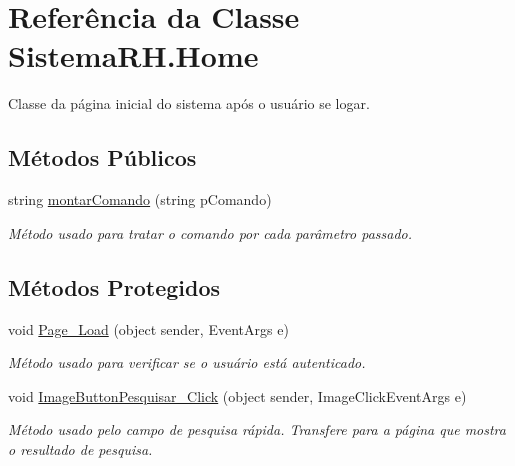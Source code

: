 \hypertarget{class_sistema_r_h_1_1_home}{
\section{Referência da Classe SistemaRH.Home}
\label{class_sistema_r_h_1_1_home}
}


Classe da página inicial do sistema após o usuário se logar.  


\subsection*{Métodos Públicos}
\begin{DoxyCompactItemize}
\item 
string \hyperlink{class_sistema_r_h_1_1_home_a880232f3a5dc9e27a71026e0c8c94d9b}{montarComando} (string pComando)
\begin{DoxyCompactList}\small\item\em Método usado para tratar o comando por cada parâmetro passado. \item\end{DoxyCompactList}\end{DoxyCompactItemize}
\subsection*{Métodos Protegidos}
\begin{DoxyCompactItemize}
\item 
void \hyperlink{class_sistema_r_h_1_1_home_a71a594640be18a2c7ee108b3cc1713aa}{Page\_\-Load} (object sender, EventArgs e)
\begin{DoxyCompactList}\small\item\em Método usado para verificar se o usuário está autenticado. \item\end{DoxyCompactList}\item 
void \hyperlink{class_sistema_r_h_1_1_home_ab0dac8f9d434bf637994b34cb683cba3}{ImageButtonPesquisar\_\-Click} (object sender, ImageClickEventArgs e)
\begin{DoxyCompactList}\small\item\em Método usado pelo campo de pesquisa rápida. Transfere para a página que mostra o resultado de pesquisa. \item\end{DoxyCompactList}\end{DoxyCompactItemize}
